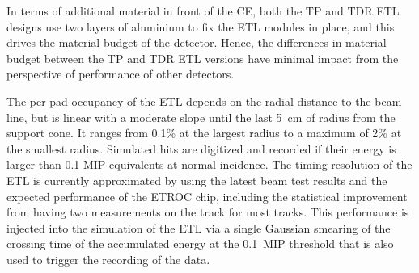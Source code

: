 In terms of additional material in front of the CE, both the TP and TDR ETL designs use two layers of aluminium to fix the ETL modules in place, and this drives the material budget of the detector. Hence, the differences in material budget between the TP and TDR ETL versions have minimal impact from the perspective of performance of other detectors. 


The per-pad occupancy of the ETL depends on the radial distance to the beam line, but is linear with a moderate slope until the last 5~cm of radius from the support cone. It ranges from 0.1\% at the largest radius to a maximum of 2\% at the smallest radius.
Simulated hits are digitized and recorded if their energy is larger than 0.1 MIP-equivalents at normal incidence. The timing resolution of the ETL is currently approximated by using the latest beam test results and the expected performance of the ETROC chip, including the statistical improvement from having two measurements on the track for most tracks. This performance is injected into the simulation of the ETL via a single Gaussian smearing of the crossing time of the accumulated energy at the 0.1~MIP threshold that is also used to trigger the recording of the data. 





